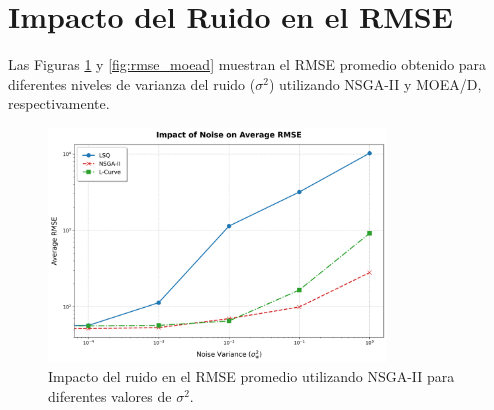 


\section{Impacto del Ruido en el RMSE} \label{sec:results:noise}

Las Figuras \ref{fig:rmse_nsga2} y \ref{fig:rmse_moead} muestran el RMSE promedio obtenido para diferentes niveles de varianza del ruido (\( \sigma^2 \)) utilizando NSGA-II y MOEA/D, respectivamente.

\begin{figure}[H]
    \centering
    \includegraphics[width=0.8\textwidth]{Images/impact_noise_on_rmse_nsga2.png}
    \caption{Impacto del ruido en el RMSE promedio utilizando NSGA-II para diferentes valores de \( \sigma^2 \).}
    \label{fig:rmse_nsga2}
\end{figure}

